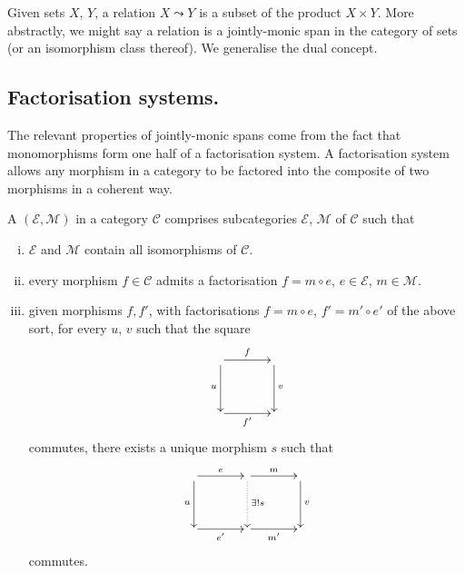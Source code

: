 Given sets $X$, $Y$, a relation $X \leadsto Y$ is a subset of the product $X
\times Y$. More abstractly, we might say a relation is a jointly-monic span in
the category of sets (or an isomorphism class thereof). We generalise the dual
concept.

\subsection{Factorisation systems.}
The relevant properties of jointly-monic spans come from the fact that
monomorphisms form one half of a factorisation system. A factorisation system
allows any morphism in a category to be factored into the composite of two
morphisms in a coherent way.

\begin{definition}
  A  $(\mathcal E,\mathcal M)$ in a category
  $\mathcal C$ comprises subcategories $\mathcal E$, $\mathcal M$ of $\mathcal
  C$ such that
  \begin{enumerate}[(i)]
    \item $\mathcal E$ and $\mathcal M$ contain all isomorphisms of $\mathcal
      C$.
    \item  every morphism $f \in \mathcal C$ admits a factorisation $f=m \circ
      e$, $e \in \mathcal E$, $m \in \mathcal M$.
\item given morphisms $f,f'$, with factorisations $f = m \circ e$, $f' = m' \circ
  e'$ of the above sort, for every $u$, $v$ such that the square
  \[
    \xymatrixcolsep{3pc}
    \xymatrixrowsep{3pc}
    \xymatrix{
       \ar[r]^f \ar[d]_u &  \ar[d]^v \\
       \ar[r]_{f'} & 
    }
  \]
  commutes, there exists a unique morphism $s$ such that
  \[
    \xymatrixcolsep{3pc}
    \xymatrixrowsep{3pc}
    \xymatrix{
      \ar[r]^e \ar[d]_u & \ar[r]^m \ar@{.>}[d]^{\exists! s} &  \ar[d]^v \\
       \ar[r]_{e'}& \ar[r]_{m'} & 
    }
  \]
  commutes.
  \end{enumerate}
\end{definition}

